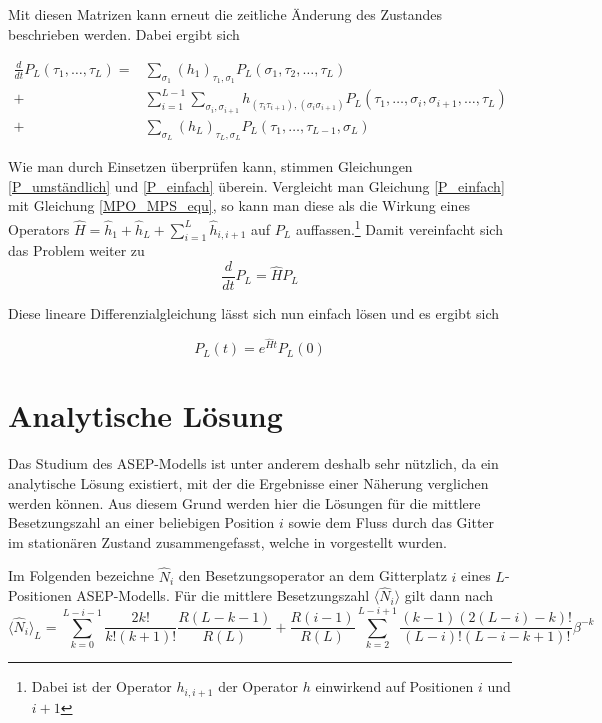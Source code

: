 \documentclass[10pt,a4paper]{report}
\begin{document}
Mit diesen Matrizen kann erneut die zeitliche Änderung des Zustandes beschrieben werden. Dabei ergibt sich

\begin{equation}\label{P_einfach}
\begin{split}
\frac{d}{dt}P_L(\tau_1,\ldots,\tau_L) =& \sum_{\sigma_1}(h_1)_{\tau_1,\sigma_1}P_L(\sigma_1,\tau_2,\ldots,\tau_L)\\
+&\sum_{i=1}^{L-1}\sum_{\sigma_i,\sigma_{i+1}}h_{(\tau_i\tau_{i+1}),(\sigma_i\sigma_{i+1})}P_L(\tau_1,\ldots,\sigma_i,\sigma_{i+1},\ldots,\tau_L)\\
+&\sum_{\sigma_L}(h_L)_{\tau_L,\sigma_L}P_L(\tau_1,\ldots,\tau_{L-1},\sigma_L)
\end{split}
\end{equation}

Wie man durch Einsetzen überprüfen kann, stimmen Gleichungen \ref{P_umständlich} und \ref{P_einfach} überein. Vergleicht man Gleichung \ref{P_einfach} mit Gleichung \ref{MPO_MPS_equ}, so kann man diese als die Wirkung eines Operators $\hat{H}=\hat{h}_1+\hat{h}_L+\sum_{i=1}^L\hat{h}_{i,i+1}$ auf $P_L$ auffassen.\footnote{Dabei ist der Operator $h_{i,i+1}$ der Operator $h$ einwirkend auf Positionen $i$ und $i+1$} Damit vereinfacht sich das Problem weiter zu
\begin{equation}
\frac{d}{dt}P_L=\hat{H}P_L
\end{equation}

Diese lineare Differenzialgleichung lässt sich nun einfach lösen und es ergibt sich

\begin{equation}\label{ASEP_solution_equ}
P_L(t)=e^{\hat{H}t}P_L(0)
\end{equation}

\section{Analytische Lösung}

Das Studium des ASEP-Modells ist unter anderem deshalb sehr nützlich, da ein analytische Lösung existiert, mit der die Ergebnisse einer Näherung verglichen werden können. Aus diesem Grund werden hier die Lösungen für die mittlere Besetzungszahl an einer beliebigen Position $i$ sowie dem Fluss durch das Gitter im stationären Zustand zusammengefasst, welche in \cite{ASEP} vorgestellt wurden.

Im Folgenden bezeichne $\hat{N}_i$ den Besetzungsoperator an dem Gitterplatz $i$ eines $L$-Positionen ASEP-Modells. Für die mittlere Besetzungszahl $\langle\hat{N}_i\rangle$ gilt dann nach \cite{ASEP}
\begin{equation}
\langle\hat{N}_i\rangle_L=\sum_{k=0}^{L-i-1}\frac{2k!}{k!(k+1)!}\frac{R(L-k-1)}{R(L)}+\frac{R(i-1)}{R(L)}\sum_{k=2}^{L-i+1}\frac{(k-1)(2(L-i)-k)!}{(L-i)!(L-i-k+1)!}\beta^{-k}
\end{equation}
\end{document}
